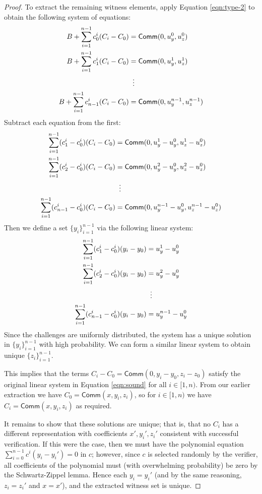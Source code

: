 \documentclass{article}
\newcommand{\func}[1]{\mathsf{#1}}
\newcommand{\comm}{\func{Comm}}
\begin{document}
\begin{proof}
To extract the remaining witness elements, apply Equation \ref{eqn:type-2} to obtain the following system of equations:
\begin{gather}
\begin{aligned}
    \label{eqn:sound}
    B + \sum_{i=1}^{n-1} c_0^i(C_i - C_0) &= \comm(0, u_y^0, u_z^0) \\
    B + \sum_{i=1}^{n-1} c_1^i(C_i - C_0) &= \comm(0, u_y^1, u_z^1) \\
    &\vdotswithin{=} \\
    B + \sum_{i=1}^{n-1} c_{n-1}^i(C_i - C_0) &= \comm(0, u_y^{n-1}, u_z^{n-1})
\end{aligned}
\end{gather}
Subtract each equation from the first:
\begin{align*}
    \sum_{i=1}^{n-1} (c_1^i - c_0^i)(C_i - C_0) &= \comm(0, u_y^1 - u_y^0, u_z^1 - u_z^0) \\
    \sum_{i=1}^{n-1} (c_2^i - c_0^i)(C_i - C_0) &= \comm(0, u_y^2 - u_y^0, u_z^2 - u_z^0) \\
    &\vdotswithin{=} \\
    \sum_{i=1}^{n-1} (c_{n-1}^i - c_0^i)(C_i - C_0) &= \comm(0, u_y^{n-1} - u_y^0, u_z^{n-1} - u_z^0)
\end{align*}
Then we define a set $\{y_i\}_{i=1}^{n-1}$ via the following linear system:
\begin{align*}
    \sum_{i=1}^{n-1} (c_1^i - c_0^i)(y_i - y_0) &= u_y^1 - u_y^0 \\
    \sum_{i=1}^{n-1} (c_2^i - c_0^i)(y_i - y_0) &= u_y^2 - u_y^0 \\
    &\vdotswithin{=} \\
    \sum_{i=1}^{n-1} (c_{n-1}^i - c_0^i)(y_i - y_0) &= u_y^{n-1} - u_y^0
\end{align*}
Since the challenges are uniformly distributed, the system has a unique solution in $\{y_i\}_{i=1}^{n-1}$ with high probability.
We can form a similar linear system to obtain unique $\{z_i\}_{i=1}^{n-1}$.

This implies that the terms $C_i - C_0 = \comm(0, y_i - y_0, z_i - z_0)$ satisfy the original linear system in Equation \ref{eqn:sound} for all $i \in [1,n)$.
From our earlier extraction we have $C_0 = \comm(x, y_i, z_i)$, so for $i \in [1,n)$ we have $C_i = \comm(x, y_i, z_i)$ as required.

It remains to show that these solutions are unique; that is, that no $C_i$ has a different representation with coefficients $x',y_i',z_i'$ consistent with successful verification.
If this were the case, then we must have the polynomial equation $\sum_{i=0}^{n-1} c^i(y_i - y_i') = 0$ in $c$; however, since $c$ is selected randomly by the verifier, all coefficients of the polynomial must (with overwhelming probability) be zero by the Schwartz-Zippel lemma.
Hence each $y_i = y_i'$ (and by the same reasoning, $z_i = z_i'$ and $x = x'$), and the extracted witness set is unique.


\end{proof}
\end{document}
